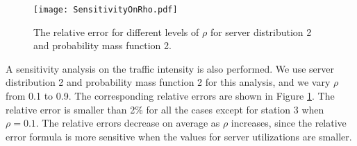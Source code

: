 \documentclass[11pt]{article}\topmargin 0mm
\begin{document}
\begin{figure}
\centering
\texttt{[image: SensitivityOnRho.pdf]}
\caption{The relative error for different levels of $\rho$ for server distribution 2 and probability mass function 2. \label{fig:sensitity_on_rho}}
\end{figure}
A sensitivity analysis on the traffic intensity is also
performed. We use server distribution 2 and probability mass
function 2 for this analysis, and we vary $\rho$ from 0.1 to
0.9. The corresponding relative errors are shown in Figure
\ref{fig:sensitity_on_rho}. The relative error is smaller than
2\% for all the cases except for station 3 when $\rho=0.1$. The
relative errors decrease on average as $\rho$ increases, since
the relative error formula is more sensitive when the values
for server utilizations are smaller.
\end{document}
